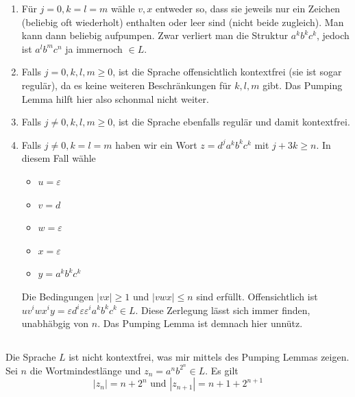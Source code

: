 \documentclass{article}
\begin{document}
\let\oldlabelenumi\labelenumi
\renewcommand{\labelenumi}{\textbf{Fall \arabic*:}}
\begin{enumerate}[leftmargin=*]
   \item Für $j = 0, k=l=m$ wähle $v,x$ entweder so, dass sie jeweils nur ein
      Zeichen (beliebig oft wiederholt) enthalten oder leer sind (nicht beide
      zugleich). Man kann dann beliebig aufpumpen. Zwar verliert man die
      Struktur $a^kb^kc^k$, jedoch ist $a^lb^mc^n$ ja immernoch $\in L$.
   \item 
      Falls $j=0,k,l,m \ge 0$, ist die Sprache offensichtlich kontextfrei (sie
      ist sogar regulär), da es keine weiteren Beschränkungen für $k,l,m$ gibt. Das
      Pumping Lemma hilft hier also schonmal nicht weiter.
   \item Falls $j \neq 0, k, l, m \ge 0$, ist die Sprache ebenfalls regulär und
      damit kontextfrei.
   \item
      Falls $j \neq 0, k = l = m$ haben wir ein Wort $z =
      d^ja^kb^kc^k$ mit $j+3k\ge n$. In diesem Fall wähle
      \begin{itemize}
         \item $u=\varepsilon$
         \item $v = d$
         \item $w=\varepsilon$
         \item $x=\varepsilon$
         \item $y=a^kb^kc^k$
      \end{itemize}
      Die Bedingungen $|vx|\ge 1$ und $|vwx| \le n$ sind erfüllt.
      Offensichtlich ist $uv^iwx^iy = \varepsilon d^i\varepsilon
      \varepsilon^ia^kb^kc^k \in L$. Diese Zerlegung lässt sich immer finden,
      unabhäbgig von $n$. Das Pumping Lemma ist demnach hier unnütz.

\end{enumerate}

\subsection{} 

Die Sprache $L$ ist nicht kontextfrei, was mir mittels des Pumping Lemmas
zeigen. Sei $n$ die Wortmindestlänge und $z_n = a^nb^{2^n} \in L$. Es gilt
\begin{equation*}
   |z_n| = n + 2^n \text{ und } |z_{n+1}| = n + 1 + 2^{n+1}
\end{equation*}
\end{document}
